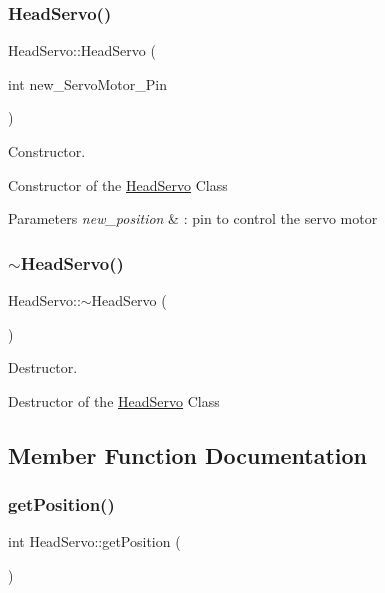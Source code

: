 \subsubsection{\texorpdfstring{Head\+Servo()}{HeadServo()}}
{\footnotesize\ttfamily Head\+Servo\+::\+Head\+Servo (\begin{DoxyParamCaption}\item[{int}]{new\+\_\+\+Servo\+Motor\+\_\+\+Pin }\end{DoxyParamCaption})}



Constructor. 

Constructor of the \hyperlink{class_head_servo}{Head\+Servo} Class\textquotesingle{}


\begin{DoxyParams}{Parameters}
{\em new\+\_\+position} & \+: pin to control the servo motor \\
\hline
\end{DoxyParams}
\mbox{\label{class_head_servo_a5d60523eb1986f36cba6aff92afee0b7}} 
\subsubsection{\texorpdfstring{$\sim$\+Head\+Servo()}{~HeadServo()}}
{\footnotesize\ttfamily Head\+Servo\+::$\sim$\+Head\+Servo (\begin{DoxyParamCaption}{ }\end{DoxyParamCaption})}



Destructor. 

Destructor of the \hyperlink{class_head_servo}{Head\+Servo} Class\textquotesingle{} 

\subsection{Member Function Documentation}
\mbox{\label{class_head_servo_a84eadc00f5cdd262d1b212a306a0930c}} 
\subsubsection{\texorpdfstring{get\+Position()}{getPosition()}}
{\footnotesize\ttfamily int Head\+Servo\+::get\+Position (\begin{DoxyParamCaption}{ }\end{DoxyParamCaption})}



